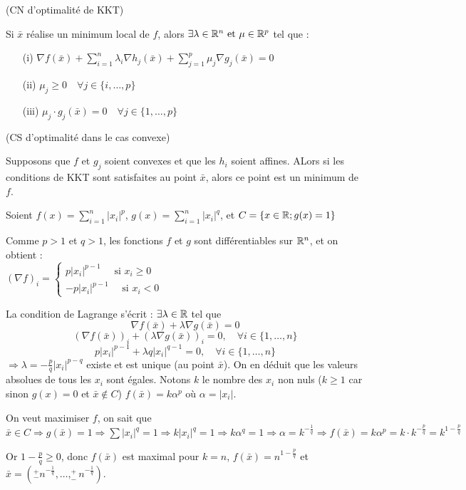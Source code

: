 \begin{theoreme} (CN d'optimalité de KKT)

Si $\bar{x}$ réalise un minimum local de $f$, alors $\exists \lambda \in \mathbb{R}^n \text{  et } \mu \in \mathbb{R}^p$ tel que :
	\begin{itemize}
		\item[(i)] $\displaystyle \nabla f(\bar{x}) + \sum_{i=1}^n \lambda _i \nabla h_j (\bar{x}) + \sum_{j=1}^p \mu _j \nabla g_j (\bar{x}) = 0$
		\item[(ii)] $ \mu _j \geq 0 \quad \forall j \in \{ i, \dots , p \}$
		\item[(iii)] $ \mu _j \cdot g_j(\bar{x}) = 0 \quad \forall j \in \{ 1, \dots , p \}$
	\end{itemize}
\end{theoreme}

\begin{theoreme} (CS d'optimalité dans le cas convexe)

Supposons que $f$ et $g_j$ soient convexes et que les $h_i$ soient affines. ALors si les conditions de KKT sont satisfaites au point $\bar{x}$, alors ce point est un minimum de $f$.
\end{theoreme}
\begin{exemple} %

	Soient $ \displaystyle f(x) = \sum_{i=1}^n |x_i|^p $, 
	$ \displaystyle g(x) = \sum_{i=1}^n |x_i|^q $, et
	$ \displaystyle C = \{ x \in \mathbb{R} ; g(x) = 1 \} $
	
	
	Comme $p>1$ et $q>1$, les fonctions $f$ et $g$ sont différentiables sur $\mathbb{R}^n$, et on obtient :\\ $\displaystyle (\nabla f)_i = \begin{cases} p |x_i|^{p-1} \quad \text{ si }x_i\geq 0 \\  -p |x_i|^{p-1} \quad \text{ si } x_i < 0  \end{cases}$ 
	
	La condition de Lagrange s'écrit : $\exists \lambda \in \mathbb{R}$ tel que 
	\[ \nabla f(\bar{x}) + \lambda \nabla g(\bar{x}) = 0 \]
	\[ (\nabla f(\bar{x}))_i + (\lambda \nabla g(\bar{x}))_i = 0 , \quad \forall i \in \{ 1, \dots, n \} \]
	\[ p|x_i|^{p-1} + \lambda q|x_i|^{q-1} = 0 , \quad \forall i \in \{ 1, \dots, n \} \]
	$ \Rightarrow \lambda = - \frac{p}{q}|x_i|^{p-q} $ existe et est unique (au point $\bar{x}$). On en déduit que les valeurs absolues de tous les $x_i$ sont égales.
	Notons $k$ le nombre des $x_i$ non nuls ($k \geq 1$ car sinon $g(x) = 0$ et $\bar{x} \not \in C$)
	$f(\bar{x}) = k \alpha ^p$ où $\alpha = |x_i|$.
	
	On veut maximiser $f$, on sait que $\bar{x} \in C \Rightarrow g(\bar{x}) = 1 \Rightarrow \sum |x_i|^q = 1 \Rightarrow k |x_i|^q = 1 \Rightarrow k \alpha^q = 1 \Rightarrow \alpha = k^{-\frac{1}{q}} \Rightarrow f(\bar{x}) = k \alpha^p = k \cdot k^{-\frac{p}{q}} = k^{1-\frac{p}{q}} $
	
	Or $1-\frac{p}{q} \geq 0$, donc $f(\bar{x})$ est maximal pour $k=n$, $f(\bar{x}) = n^{1-\frac{p}{q}}$ et $\bar{x} = (^+_- n^{-\frac{1}{q}}, \dots, ^+_- n^{-\frac{1}{q}})$.
	
\end{exemple}

